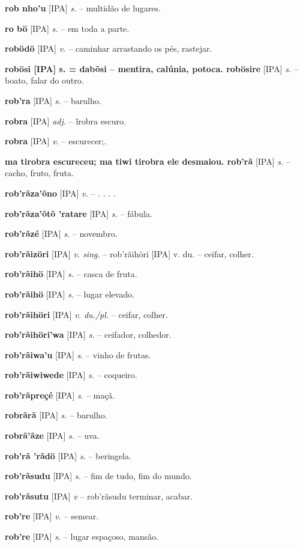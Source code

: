 \textbf{rob nho'u} [IPA] \textit{s.} -- multidão de lugares.

\textbf{ro bö} [IPA] \textit{s.} -- em toda a parte.

\textbf{robödö} [IPA] \textit{v.} -- caminhar arrastando os pés, rastejar.

\textbf{robösi [IPA] s. = dabõsi -- mentira, calúnia, potoca. robösire} [IPA] \textit{s.} -- boato, falar do outro.

\textbf{rob'ra} [IPA] \textit{s.} -- barulho.

\textbf{robra} [IPA] \textit{adj.} -- ĩrobra escuro.

\textbf{robra} [IPA] \textit{v.} -- escurecer;.

\textbf{ma tirobra escureceu; ma tiwi tirobra ele desmaiou. rob'rã} [IPA] \textit{s.} -- cacho, fruto, fruta.

\textbf{rob'rãza'õno} [IPA] \textit{v.} -- . . . .

\textbf{rob'rãza'õtõ 'ratare} [IPA] \textit{s.} -- fábula.

\textbf{rob'rãzé} [IPA] \textit{s.} -- novembro.

\textbf{rob'rãizöri} [IPA] \textit{v. sing.} -- rob'rãihöri [IPA] v. du. -- ceifar, colher.

\textbf{rob'rãihö} [IPA] \textit{s.} -- casca de fruta.

\textbf{rob'rãihö} [IPA] \textit{s.} -- lugar elevado.

\textbf{rob'rãihöri} [IPA] \textit{v. du./pl.} -- ceifar, colher.

\textbf{rob'rãihöri'wa} [IPA] \textit{s.} -- ceifador, colhedor.

\textbf{rob'rãiwa'u} [IPA] \textit{s.} -- vinho de frutas.

\textbf{rob'rãiwiwede} [IPA] \textit{s.} -- coqueiro.

\textbf{rob'rãpreçé} [IPA] \textit{s.} -- maçã.

\textbf{robrãrã} [IPA] \textit{s.} -- barulho.

\textbf{robrã'ãze} [IPA] \textit{s.} -- uva.

\textbf{rob'rã 'rãdö} [IPA] \textit{s.} -- beringela.

\textbf{rob'rãsudu} [IPA] \textit{s.} -- fim de tudo, fim do mundo.

\textbf{rob'rãsutu} [IPA] \textit{v} -- rob'rãsudu terminar, acabar.

\textbf{rob're} [IPA] \textit{v.} -- semear.

\textbf{rob're} [IPA] \textit{s.} -- lugar espaçoso, mansão.

